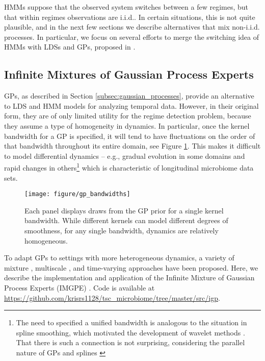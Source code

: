 \documentclass[14pt]{extarticle}
\begin{document}
HMMs suppose that the observed system switches between a few regimes, but that
within regimes observations are i.i.d.. In certain situations, this is not quite
plausible, and in the next few sections we describe alternatives that mix
non-i.i.d. processes. In particular, we focus on several efforts to merge the
switching idea of HMMs with LDSs and GPs, proposed in
\citep{ghahramani1998variational, rasmussen2002infinite, fox2012multiresolution,
  linderman2016recurrent}.

\subsection{Infinite Mixtures of Gaussian Process Experts}
\label{subsec:imgpe}

GPs, as described in Section \ref{subsec:gaussian_processes}, provide an
alternative to LDS and HMM models for analyzing temporal data. However, in their
original form, they are of only limited utility for the regime detection
problem, because they assume a type of homogeneity in dynamics. In particular,
once the kernel bandwidth for a GP is specified, it will tend to have
fluctuations on the order of that bandwidth throughout its entire domain, see
Figure \ref{fig:gp_bandwidths}. This makes it difficult to model differential
dynamics -- e.g., gradual evolution in some domains and rapid changes in
others\footnote{The need to specified a unified bandwidth is analogous to the
  situation in spline smoothing, which motivated the development of wavelet
  methods \citep{donoho1995adapting}. That there is such a connection is not
  surprising, considering the parallel nature of GPs and splines
  \citep{kimeldorf1970correspondence}} which is characteristic of longitudinal
microbiome data sets.

\begin{figure}
  \centering
  \texttt{[image: figure/gp\_bandwidths]}
  \caption{Each panel displays draws from the GP prior for a single kernel
    bandwidth. While different kernels can model different degrees of
    smoothness, for any single bandwidth, dynamics are relatively
    homogeneous. \label{fig:gp_bandwidths} }
\end{figure}

To adapt GPs to settings with more heterogeneous dynamics, a variety of mixture
\citep{tresp2001mixtures, rasmussen2002infinite}, multiscale
\citep{fox2012multiresolution, samostring}, and time-varying
\citep{paciorek2003nonstationary, heinonen2016non} approaches have been
proposed. Here, we describe the implementation and application of the Infinite
Mixture of Gaussian Process Experts (IMGPE) \citep{rasmussen2002infinite}. Code
is available at
\url{https://github.com/krisrs1128/tsc_microbiome/tree/master/src/igp}.
\end{document}
